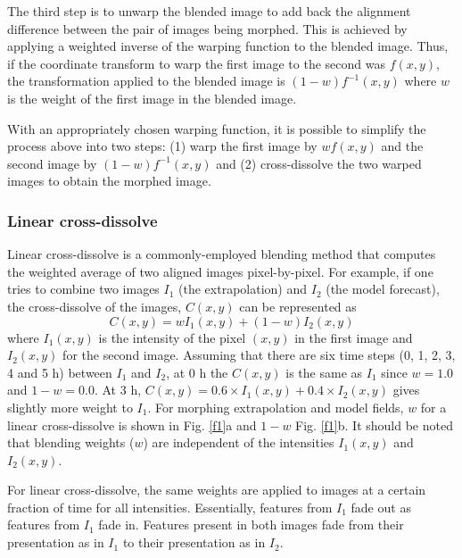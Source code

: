 \documentclass[12pt]{article}
\begin{document}
The third step is to unwarp the blended image to add back the alignment
difference between the pair of images being morphed. This is achieved by
applying a weighted inverse of the warping function to the blended image. Thus,
if the coordinate transform to warp the first image to the second
was $f(x,y)$, the transformation applied to the blended image is
$(1-w)f^{-1}(x,y)$ where $w$ is the weight of the first image in the blended
image.

With an appropriately chosen warping function, it is possible to simplify
the process above into two steps:  (1) warp the first image by $wf(x,y)$
and the second image by $(1-w)f^{-1}(x,y)$ and (2) cross-dissolve the
two warped images to obtain the morphed image.

\subsubsection{Linear cross-dissolve}
Linear cross-dissolve is a commonly-employed blending method that computes the weighted average of two aligned images pixel-by-pixel. For example, if one tries to combine two images $I_{1}$ (the extrapolation) and $I_{2}$ (the model forecast), the cross-dissolve of the images, $C(x,y)$ can be represented as 
\begin{equation}
 C(x,y)=wI_{1}(x,y)+(1-w)I_{2}(x,y)
 \end{equation}
 where $I_{1}(x,y)$ is the intensity of the pixel $(x,y)$ in the first image and $I_{2}(x,y)$ for the second image. Assuming that there are six time steps (0, 1, 2, 3, 4 and 5 h) between $I_{1}$ and $I_{2}$, at 0 h the $C(x,y)$ is the same as $I_{1}$ since $w=1.0$ and $1-w=0.0$. At 3 h,  $C(x,y)=0.6 \times I_{1}(x,y)+0.4 \times I_{2}(x,y)$ gives slightly more weight to $I_{1}$. For morphing extrapolation and model fields, $w$ for a linear cross-dissolve is shown in Fig. \ref{f1}a and $1-w$ Fig. \ref{f1}b. It should be noted that blending weights ($w$) are independent of the intensities $I_{1}(x,y)$ and $I_{2}(x,y)$.
 
 For linear cross-dissolve, the same weights are applied to images at a certain fraction of time for all intensities. Essentially, features from $I_{1}$ fade out as features from $I_{1}$ fade in. Features present in both images fade from their presentation as in $I_{1}$ to their presentation as in $I_{2}$.
 
\end{document}
